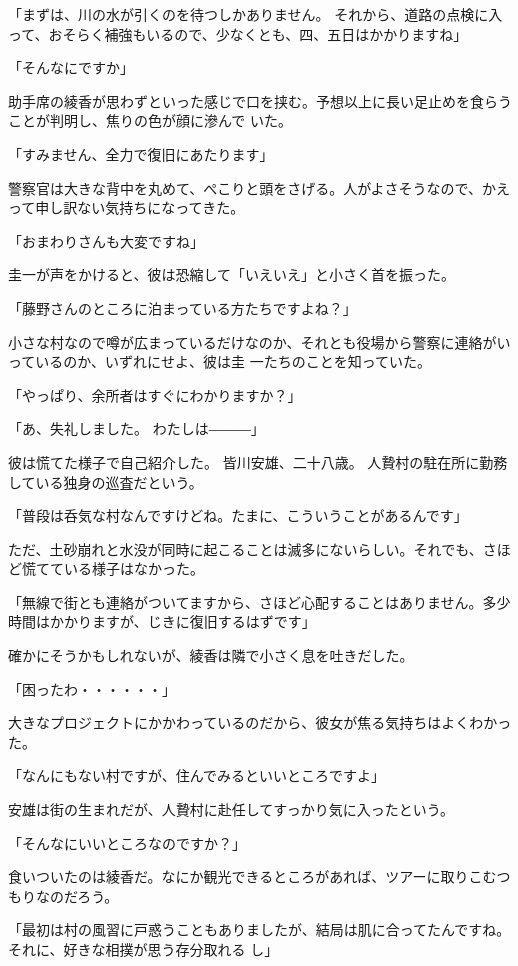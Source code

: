 ﻿\documentclass[book,tate]{jlreq}
\begin{document}
「まずは、川の水が引くのを待つしかありません。 それから、道路の点検に入って、おそらく補強もいるので、少なくとも、四、五日はかかりますね」

「そんなにですか」

助手席の綾香が思わずといった感じで口を挟む。予想以上に長い足止めを食らうことが判明し、焦りの色が顔に滲んで いた。

「すみません、全力で復旧にあたります」

警察官は大きな背中を丸めて、ぺこりと頭をさげる。人がよさそうなので、かえって申し訳ない気持ちになってきた。

「おまわりさんも大変ですね」

圭一が声をかけると、彼は恐縮して「いえいえ」と小さく首を振った。

「藤野さんのところに泊まっている方たちですよね？」

小さな村なので噂が広まっているだけなのか、それとも役場から警察に連絡がいっているのか、いずれにせよ、彼は圭 一たちのことを知っていた。

「やっぱり、余所者はすぐにわかりますか？」

「あ、失礼しました。 わたしは―――」

彼は慌てた様子で自己紹介した。 皆川安雄、二十八歳。 人贄村の駐在所に勤務している独身の巡査だという。

「普段は呑気な村なんですけどね。たまに、こういうことがあるんです」

ただ、土砂崩れと水没が同時に起こることは滅多にないらしい。それでも、さほど慌てている様子はなかった。

「無線で街とも連絡がついてますから、さほど心配することはありません。多少時間はかかりますが、じきに復旧するはずです」

確かにそうかもしれないが、綾香は隣で小さく息を吐きだした。

「困ったわ・・・・・・」

大きなプロジェクトにかかわっているのだから、彼女が焦る気持ちはよくわかった。

「なんにもない村ですが、住んでみるといいところですよ」

安雄は街の生まれだが、人贄村に赴任してすっかり気に入ったという。

「そんなにいいところなのですか？」

食いついたのは綾香だ。なにか観光できるところがあれば、ツアーに取りこむつもりなのだろう。

「最初は村の風習に戸惑うこともありましたが、結局は肌に合ってたんですね。それに、好きな相撲が思う存分取れる し」
\end{document}
